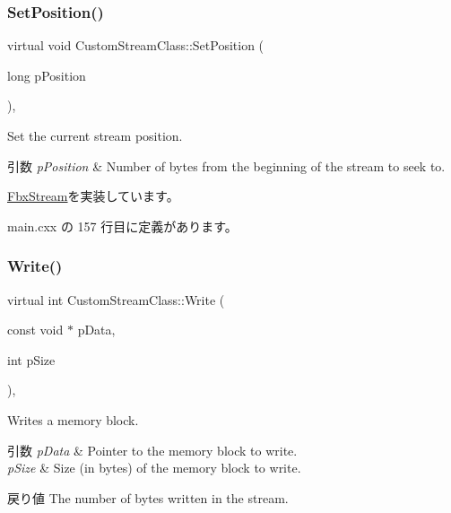 \subsubsection{\texorpdfstring{Set\+Position()}{SetPosition()}}
{\footnotesize\ttfamily virtual void Custom\+Stream\+Class\+::\+Set\+Position (\begin{DoxyParamCaption}\item[{long}]{p\+Position }\end{DoxyParamCaption})\hspace{0.3cm}{\ttfamily [inline]}, {\ttfamily [virtual]}}

Set the current stream position. 
\begin{DoxyParams}{引数}
{\em p\+Position} & Number of bytes from the beginning of the stream to seek to. \\
\hline
\end{DoxyParams}


\hyperlink{class_fbx_stream_aeb8843a4daec9d82187cc3eea5bb9baa}{Fbx\+Stream}を実装しています。



 main.\+cxx の 157 行目に定義があります。

\mbox{\label{class_custom_stream_class_a952b5466395a669fb9f8458faf2f3046}} 
\subsubsection{\texorpdfstring{Write()}{Write()}}
{\footnotesize\ttfamily virtual int Custom\+Stream\+Class\+::\+Write (\begin{DoxyParamCaption}\item[{const void $\ast$}]{p\+Data,  }\item[{int}]{p\+Size }\end{DoxyParamCaption})\hspace{0.3cm}{\ttfamily [inline]}, {\ttfamily [virtual]}}

Writes a memory block. 
\begin{DoxyParams}{引数}
{\em p\+Data} & Pointer to the memory block to write. \\
\hline
{\em p\+Size} & Size (in bytes) of the memory block to write. \\
\hline
\end{DoxyParams}
\begin{DoxyReturn}{戻り値}
The number of bytes written in the stream. 
\end{DoxyReturn}


